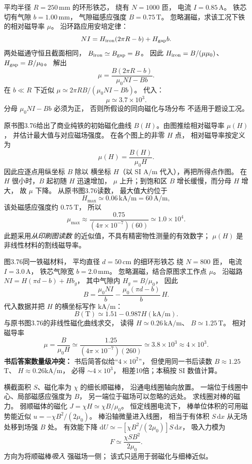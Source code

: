 平均半径
$R=250\,\mathrm{mm}$ 的环形铁芯，
绕有 $N=1000$ 匝，
电流 $I=0.85\,\mathrm A$。
铁芯切有气隙
$b=1.00\,\mathrm{mm}$，
气隙磁感应强度
$B=0.75\,\mathrm T$。
忽略漏磁，求该工况下铁的相对磁导率 $\mu$。
\exsolution
沿环路应用安培定律：
\[
NI=H_{\rm iron}(2\pi R-b)+H_{\rm gap}b.
\]
两处磁通守恒且截面相同，
$B_{\rm iron}\simeq B_{\rm gap}=B$。
因此
$H_{\rm iron}=B/(\mu\mu_0)$、
$H_{\rm gap}=B/\mu_0$。
解出
\[
\boxed{\mu=
\frac{B(2\pi R-b)}
{\mu_0NI-Bb}}.
\]
在 $b\ll R$ 下近似
$\mu\simeq2\pi RB/(\mu_0NI-Bb)$。
代入：
\[
\boxed{\mu\simeq3.7\times10^3}.
\]
\excheck 分母 $\mu_0NI-Bb$ 必须为正，
否则所假设的同向磁化与场分布
不适用于题设工况。

原书图3.76给出了商业纯铁的初始磁化曲线
$B(H)$。由图推绘相对磁导率 $\mu(H)$，
并估计最大值与对应磁场强度。
\exsolution
在各个图上的非零 $H$ 点，
相对磁导率按定义为
\[
\boxed{\mu(H)=\frac{B(H)}{\mu_0H}}.
\]
因此应逐点用纵坐标 $B$ 除以
横坐标 $H$（以 SI
$\mathrm{A/m}$ 代入），再把所得点作图。
在 $H$ 很小时，$B$ 起初随 $H$ 迅速增加，
$\mu$ 上升；到饱和区
$B$ 增长缓慢，而分母 $H$ 增大，
故 $\mu$ 下降。
从原书图3.76读数，
最大值大约位于
\[
\boxed{H_{\max}\simeq0.06\,\mathrm{kA/m}
=60\,\mathrm{A/m}},
\]
该处磁感应强度约 $0.75\,\mathrm T$，
所以
\[
\boxed{\mu_{\max}\approx
\frac{0.75}{(4\pi\times10^{-7})(60)}
\simeq1.0\times10^4}.
\]
\excheck 此题采用\emph{从印刷图读数}
的近似值，不具有精密物性测量的有效数字；
$\mu(H)$ 是非线性材料的割线磁导率。

图3.76同一铁磁材料，
平均直径
$d=50\,\mathrm{cm}$ 的细环形铁芯
绕 $N=800$ 匝，
电流 $I=3.0\,\mathrm A$，
铁芯气隙宽
$b=2.0\,\mathrm{mm}$。
忽略漏磁，结合原图求工作点 $\mu$。
\exsolution
沿磁路
$NI=H(\pi d-b)+Hb_g$，
其中气隙内
$H_g=B/\mu_0$，
因此
\[
B=\frac{\mu_0NI}{b}
-\frac{\mu_0(\pi d-b)}{b}\,H.
\]
代入数据并把 $H$ 的横坐标写作
$\mathrm{kA/m}$：
\[
\boxed{B(\mathrm T)\simeq
1.51-0.987H(\mathrm{kA/m})}.
\]
与原书图3.76的非线性磁化曲线求交，
读得
$H\simeq0.26\,\mathrm{kA/m}$、
$B\simeq1.25\,\mathrm T$。
相对磁导率
\[
\boxed{\mu=\frac B{\mu_0H}
\simeq\frac{1.25}
{(4\pi\times10^{-7})(260)}
\simeq3.8\times10^3\approx4\times10^3}.
\]
\excheck \textbf{书后答案数量级冲突：}
书后简答似给“$4\times10^2$”，
但使用同一书后读数 $B\approx1.25$T、
$H\approx0.26$kA/m，
必得 $\sim4\times10^3$，
相差10倍；本稿按 SI 数值计算。

横截面积 $S$、磁化率为 $\chi$
的细长顺磁棒，
沿通电线圈轴向放置。
一端位于线圈中心、局部磁感应强度为 $B$，
另一端位于磁场可以忽略的远处。
求线圈对棒的磁力。
\exsolution
弱顺磁体的磁化
$J=\chi H\simeq\chi B/\mu_0$。
恒定线圈电流下，
棒单位体积的可用磁势能近似
$u=-\chi B^2/(2\mu_0)$。
棒沿轴微量进入线圈，
相当于有体积 $S\,\mathrm dx$
从无场处移到场强 $B$ 处。
有效能下降
$\mathrm dU\simeq
-[\chi B^2/(2\mu_0)]S\,\mathrm dx$，
吸入力模为
\[
\boxed{F\simeq\frac{\chi SB^2}{2\mu_0}}.
\]
\excheck 方向为将顺磁棒\emph{吸入}
强磁场一侧；
该式只适用于弱磁化与细棒近似。


